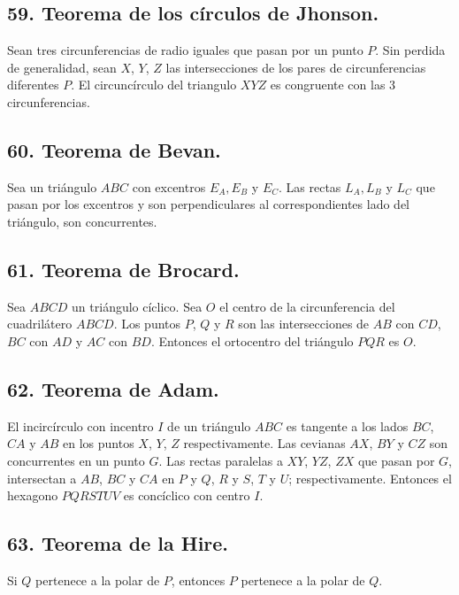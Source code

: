 \documentclass[12pt,a4paper]{article}
\begin{document}
\subsection*{59. Teorema de los círculos de Jhonson.}
Sean tres circunferencias de radio iguales que pasan por un punto $P$. Sin perdida de generalidad, sean $X$, $Y$, $Z$ las intersecciones de los pares de circunferencias diferentes $P$. El circuncírculo del triangulo $XYZ$ es congruente con las 3 circunferencias.
\subsection*{60. Teorema de Bevan.}
Sea un triángulo $ABC$ con excentros $E_A, E_B$ y $E_C$. Las rectas $L_A, L_B$ y $L_C$ que pasan por los excentros y son perpendiculares al correspondientes lado del triángulo, son concurrentes.
\subsection*{61. Teorema de Brocard.}
Sea $ABCD$ un triángulo cíclico. Sea $O$ el centro de la circunferencia del cuadrilátero $ABCD$. Los puntos $P$, $Q$ y $R$ son las intersecciones de $AB$ con $CD$, $BC$ con $AD$ y $AC$ con $BD$. Entonces el ortocentro del triángulo $PQR$ es $O$. 
\subsection*{62. Teorema de Adam.}
El incircírculo con incentro $I$ de un triángulo $ABC$ es tangente a los lados $BC$, $CA$ y $AB$ en los puntos $X$, $Y$, $Z$ respectivamente. Las cevianas  $AX$, $BY$ y $CZ$ son concurrentes en un punto $G.$ Las rectas paralelas a $XY$, $YZ$, $ZX$ que pasan por $G$, intersectan a $AB$, $BC$ y $CA$ en $P$ y $Q$, $R$ y $S$, $T$ y $U$; respectivamente. Entonces el hexagono $PQRSTUV$ es concíclico con centro $I$.
\subsection*{63. Teorema de la Hire.}
Si $Q$ pertenece a la polar de $P$, entonces $P$ pertenece a la polar de $Q$.
\end{document}
